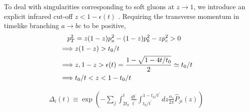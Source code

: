 To deal with singularities corresponding to soft gluons at \(z\to 1\), we introduce an explicit infrared cut-off \(z < 1-\epsilon(t)\) .  Requiring the transverse momentum in timelike branching \(a\to bc\) to be positive, 
\begin{align}
	p_T^2 &= z(1-z)p_a^2 - (1-z)p_b^2 - zp_c^2 > 0 \notag\\
	\implies& z(1-z) > t_0/t \notag\\
	\implies&  z, 1-z > \epsilon(t) = \frac{1 - \sqrt{1-4t/t_0}}{2}\simeq t_0/t \notag\\
	\implies& t_0/t < z < 1 - t_0/t
\end{align} 

\begin{align}
	\Delta_i(t) \equiv \exp(-\sum_j\int_{2t_0}^{t}
	\frac{dt^\prime}{t^\prime}
	\int_{t_0/t^\prime}^{1-t_0/t^\prime} dz
	\frac{\alpha_s}{2\pi} \hat{P}_{ji}(z))
	\label{eq:coherentSudakov}
\end{align}

